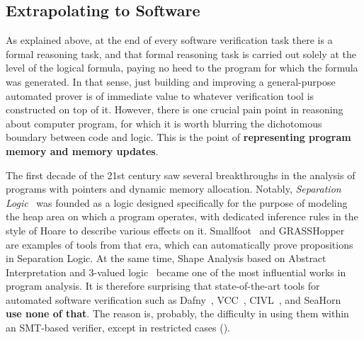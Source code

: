 \subsection{Extrapolating to Software}

As explained above, at the end of every software verification task there is a formal reasoning task, and that formal reasoning task is carried out solely at the level of the logical formula, paying no heed to the program for which the formula was generated.
In that sense, just building and improving a general-purpose automated prover is of immediate value to whatever verification tool is constructed on top of it.
However, there is one crucial pain point in reasoning about computer program, for which it is worth blurring the dichotomous boundary between code and logic.
This is the point of \textbf{representing program memory and memory updates}.

The first decade of the 21st century saw several breakthroughs in the analysis of programs with pointers and dynamic memory allocation.
Notably, \emph{Separation Logic}~\cite{LICS2002:Reynolds} was founded as a logic designed specifically for the purpose of modeling the heap area on which a program operates,
with dedicated inference rules in the style of Hoare to describe various effects on it.
Smallfoot~\cite{FMCO2005:Berdine} and GRASSHopper~\cite{TACAS2014:Piskac,CAV2014:Piskac} are examples of tools from that era, which can automatically prove propositions in Separation Logic.
At the same time, Shape Analysis based on Abstract Interpretation and 3-valued logic~\cite{CAV2014:Reps} became one of the most influential works in program analysis.
It is therefore surprising that state-of-the-art tools for automated software verification such as Dafny~\cite{LPAR2010:Leino}, VCC~\cite{TPHOL2009:Cohen}, CIVL~\cite{CAV2015:Hawblitzel}, and SeaHorn~\cite{CAV2015:Gurfinkel} \textbf{use none of that}.
The reason is, probably, the difficulty in using them within an SMT-based verifier, except in restricted cases
(\eg \cite{CAV2013:Piskac}).

